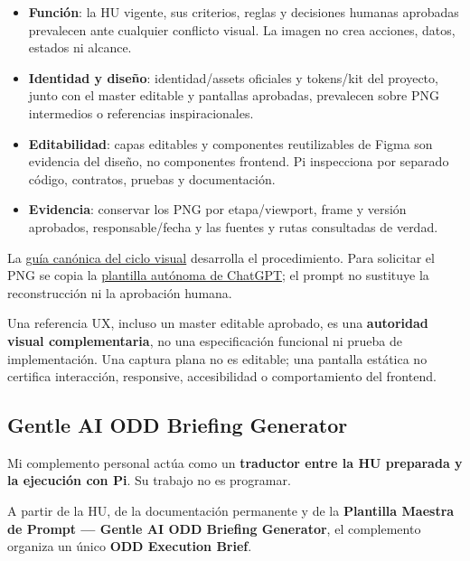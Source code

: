 \documentclass[11pt,a4paper]{article}
\begin{document}
\begin{itemize}
    \item \textbf{Función}: la HU vigente, sus criterios, reglas y decisiones humanas aprobadas prevalecen ante cualquier conflicto visual. La imagen no crea acciones, datos, estados ni alcance.
    \item \textbf{Identidad y diseño}: identidad/assets oficiales y tokens/kit del proyecto, junto con el master editable y pantallas aprobadas, prevalecen sobre PNG intermedios o referencias inspiracionales.
    \item \textbf{Editabilidad}: capas editables y componentes reutilizables de Figma son evidencia del diseño, no componentes frontend. Pi inspecciona por separado código, contratos, pruebas y documentación.
    \item \textbf{Evidencia}: conservar los PNG por etapa/viewport, frame y versión aprobados, responsable/fecha y las fuentes y rutas consultadas de verdad.
\end{itemize}

La \href{https://github.com/Alex-Fernandez-2003/workflow-with-gentle-ai/blob/docs/workflow-showcase/docs/ux/flujo-referencias-visuales.md}{guía canónica del ciclo visual} desarrolla el procedimiento. Para solicitar el PNG se copia la \href{https://github.com/Alex-Fernandez-2003/workflow-with-gentle-ai/blob/docs/workflow-showcase/docs/ux/plantilla-chatgpt-mejora-referencias-visuales.md}{plantilla autónoma de ChatGPT}; el prompt no sustituye la reconstrucción ni la aprobación humana.

\begin{warningbox}
Una referencia UX, incluso un master editable aprobado, es una \textbf{autoridad visual complementaria}, no una especificación funcional ni prueba de implementación. Una captura plana no es editable; una pantalla estática no certifica interacción, responsive, accesibilidad o comportamiento del frontend.
\end{warningbox}

\subsection{Gentle AI ODD Briefing Generator}

Mi complemento personal actúa como un \textbf{traductor entre la HU preparada y la ejecución con Pi}. Su trabajo no es programar.

A partir de la HU, de la documentación permanente y de la \textbf{Plantilla Maestra de Prompt — Gentle AI ODD Briefing Generator}, el complemento organiza un único \textbf{ODD Execution Brief}.
\end{document}
